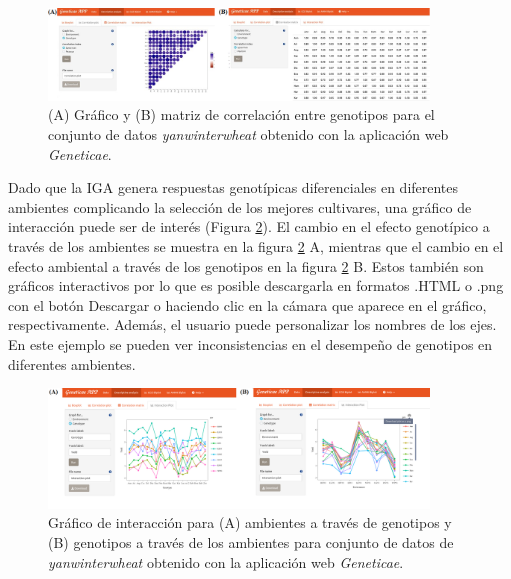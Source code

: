 \begin{figure}[h]
	\begin{center}
		\includegraphics[width=0.9\textwidth]{./Graficos/www/correlacion.png}
	\end{center}
	\caption{(A) Gráfico y (B) matriz de correlación entre genotipos para el conjunto de datos \emph{yanwinterwheat} obtenido con la aplicación web \emph{Geneticae}.}
	\label{fig:figdesc2}
\end{figure}


Dado que la IGA genera respuestas genotípicas diferenciales en diferentes ambientes complicando la selección de los mejores cultivares, una gráfico de interacción puede ser de interés (Figura \ref{fig:figdesc3}). El cambio en el efecto genotípico a través de los ambientes se muestra en la figura \ref{fig:figdesc3} A, mientras que el cambio en el efecto ambiental a través de los genotipos en la figura \ref{fig:figdesc3} B. Estos también son gráficos interactivos por lo que es posible descargarla en formatos .HTML o .png con el botón Descargar o haciendo clic en la cámara que aparece en el gráfico, respectivamente. Además, el usuario puede personalizar los nombres de los ejes. En este ejemplo se pueden ver inconsistencias en el desempeño de genotipos en diferentes ambientes. 


\begin{figure}[H]
	\begin{center}
		\includegraphics[width=0.9\textwidth]{./Graficos/www/interaction.png}
	\end{center}
	\caption{Gráfico de interacción para (A) ambientes a través de genotipos y (B) genotipos a través de los ambientes para conjunto de datos de \emph{yanwinterwheat} obtenido con la aplicación web \emph{Geneticae}.}
	\label{fig:figdesc3}
\end{figure}



